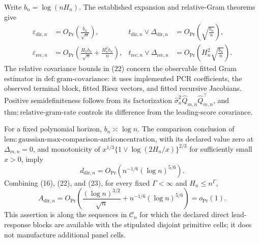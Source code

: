 Write \(b_n=\log(nH_n)\).  The established expansion and relative-Gram theorems give
\[
\begin{aligned}
 \varepsilon_{\mathrm{dir},n}
 &=O_{\Pr}\!\left(\frac{b_n}{\sqrt n}\right),
 &t_{\mathrm{dir},n}\vee\Delta_{\mathrm{dir},n}
 &=O_{\Pr}\!\left(\sqrt{\frac{b_n}{n}}\right),\\
 \varepsilon_{\mathrm{rec},n}
 &=O_{\Pr}\!\left(\frac{H_nb_n}{\sqrt n}
       +\frac{H_n^2b_n}{n}\right),
 &t_{\mathrm{rec},n}\vee\Delta_{\mathrm{rec},n}
 &=O_{\Pr}\!\left(H_n^2\sqrt{\frac{b_n}{n}}\right).              \tag{22}
\end{aligned}
\]
The relative covariance bounds in (22) concern the observable fitted Gram estimator in \(\mathrm{def{:}gram\mbox{-}covariance}\): it uses implemented PCR coefficients, the observed terminal block, fitted Riesz vectors, and fitted recursive Jacobians.  Positive semidefiniteness follows from its factorization \(\widehat\sigma_n^2\widehat Q_{m,n}\widehat Q_{m,n}^{\top}\), and \(\mathrm{thm{:}relative\mbox{-}gram\mbox{-}rate}\) controls its difference from the leading-score covariance.

For a fixed polynomial horizon, \(b_n\asymp\log n\).  The comparison conclusion of \(\mathrm{lem{:}gaussian\mbox{-}max\mbox{-}comparison\mbox{-}anticoncentration}\), with its declared value zero at \(\Delta_{m,n}=0\), and monotonicity of \(x^{1/3}\{1\vee\log(2H_n/x)\}^{2/3}\) for sufficiently small \(x>0\), imply
\[
 d_{\mathrm{dir},n}
 =O_{\Pr}\!\left(n^{-1/6}(\log n)^{5/6}\right).                   \tag{23}
\]
Combining (16), (22), and (23), for every fixed \(\Gamma<\infty\) and \(H_n\le n^\Gamma\),
\[
 A_{\mathrm{dir},n}
 =O_{\Pr}\!\left(
 \frac{(\log n)^{3/2}}{\sqrt n}
 +n^{-1/6}(\log n)^{5/6}\right)=o_{\Pr}(1).                       \tag{24}
\]
This assertion is along the sequences in \(\mathcal C_n\) for which the declared direct lead-response blocks are available with the stipulated disjoint primitive cells; it does not manufacture additional panel cells.

